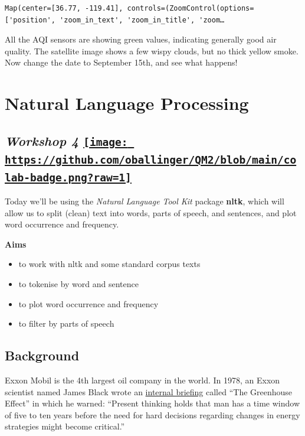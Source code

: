 \documentclass[
  letterpaper,
  DIV=11,
  numbers=noendperiod]{scrreprt}
\providecommand{\tightlist}{%
  \setlength{\itemsep}{0pt}\setlength{\parskip}{0pt}}\usepackage{longtable,booktabs,array}
\begin{document}
\begin{verbatim}
Map(center=[36.77, -119.41], controls=(ZoomControl(options=['position', 'zoom_in_text', 'zoom_in_title', 'zoom…
\end{verbatim}

All the AQI sensors are showing green values, indicating generally good
air quality. The satellite image shows a few wispy clouds, but no thick
yellow smoke. Now change the date to September 15th, and see what
happens!


\hypertarget{natural-language-processing}{%
\chapter{Natural Language
Processing}\label{natural-language-processing}}

\hypertarget{workshop-4-open-in-colab}{%
\section[\emph{Workshop 4} ]{\texorpdfstring{\emph{Workshop 4}
\href{https://colab.research.google.com/github/oballinger/QM2/blob/main/notebooks/W04.\%20Natural\%20Language\%20Processing.ipynb}{\protect\texttt{[image: https://github.com/oballinger/QM2/blob/main/colab-badge.png?raw=1]}}}{Workshop 4 Open In Colab}}\label{workshop-4-open-in-colab}}

Today we'll be using the \emph{Natural Language Tool Kit} package
\textbf{nltk}, which will allow us to split (clean) text into words,
parts of speech, and sentences, and plot word occurrence and frequency.

\textbf{Aims}

\begin{itemize}
\tightlist
\item
  to work with nltk and some standard corpus texts
\item
  to tokenise by word and sentence
\item
  to plot word occurrence and frequency
\item
  to filter by parts of speech
\end{itemize}

\hypertarget{background-1}{%
\section{Background}\label{background-1}}

Exxon Mobil is the 4th largest oil company in the world. In 1978, an
Exxon scientist named James Black wrote an
\href{https://insideclimatenews.org/documents/james-black-1977-presentation/}{internal
briefing} called ``The Greenhouse Effect'' in which he warned: ``Present
thinking holds that man has a time window of five to ten years before
the need for hard decisions regarding changes in energy strategies might
become critical.''
\end{document}
